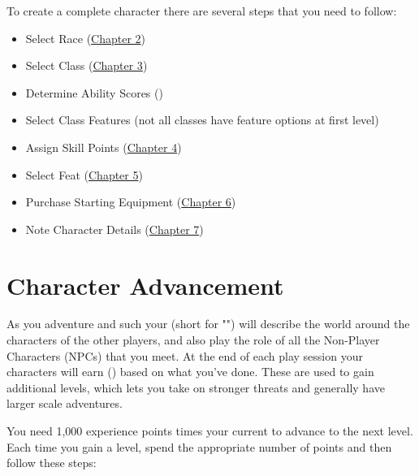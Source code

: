 To create a complete character there are several steps that you need to follow:

\begin{itemize}
\item Select Race (\hyperref[chapter:Races]{Chapter 2})
\item Select Class (\hyperref[chapter:Classes]{Chapter 3})
\item Determine Ability Scores ()
\item Select Class Features (not all classes have feature options at first level)
\item Assign Skill Points (\hyperref[chapter:Skills]{Chapter 4})
\item Select Feat (\hyperref[chapter:Feats]{Chapter 5})
\item Purchase Starting Equipment (\hyperref[chapter:Equipment]{Chapter 6})
\item Note Character Details (\hyperref[chapter:Description]{Chapter 7})
\end{itemize}

\section{Character Advancement}

As you adventure and such your  (short for "") will describe the world around the characters of the other players, and also play the role of all the Non-Player Characters (NPCs) that you meet. At the end of each play session your characters will earn  () based on what you've done. These are used to gain additional levels, which lets you take on stronger threats and generally have larger scale adventures.

You need 1,000 experience points times your current  to advance to the next level. Each time you gain a level, spend the appropriate number of points and then follow these steps:

